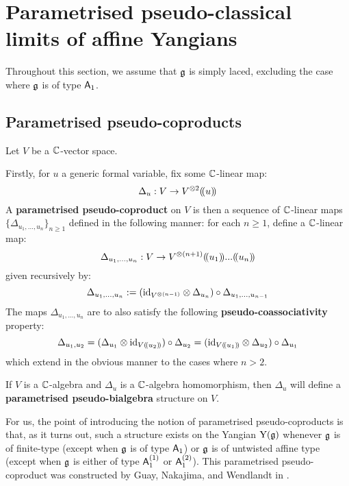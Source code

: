 \section{Parametrised pseudo-classical limits of affine Yangians}
    \begin{convention}
        Throughout this section, we assume that $\mathfrak{g}$ is simply laced, excluding the case where $\mathfrak{g}$ is of type $\mathsf{A}_1$. 
    \end{convention}

    \subsection{Parametrised pseudo-coproducts}
        \begin{definition} \label{def: parametrised_pseudo_coproducts}
            Let $V$ be a $\mathbb{C}$-vector space. 

            Firstly, for $u$ a generic formal variable, fix some $\mathbb{C}$-linear map:
                $$\Delta_u: V \to V^{\tensor 2}(\!(u)\!)$$
            A \textbf{parametrised pseudo-coproduct} on $V$ is then a sequence of $\mathbb{C}$-linear maps $\{\Delta_{u_1, ..., u_n}\}_{n \geq 1}$ defined in the following manner: for each $n \geq 1$, define a $\mathbb{C}$-linear map:
                $$\Delta_{u_1, ..., u_n}: V \to V^{\tensor (n + 1)}(\!(u_1)\!) ... (\!(u_n)\!)$$
            given recursively by:
                $$\Delta_{u_1, ..., u_n} := ( \id_{ V^{\tensor (n - 1)} } \tensor \Delta_{u_n} ) \circ \Delta_{u_1, ..., u_{n - 1}}$$
            The maps $\Delta_{u_1, ..., u_n}$ are to also satisfy the following \textbf{pseudo-coassociativity} property:
                $$\Delta_{u_1, u_2} = ( \Delta_{u_1} \tensor \id_{V(\!(u_2)\!)} ) \circ \Delta_{u_2} = ( \id_{V(\!(u_1)\!)} \tensor \Delta_{u_2} ) \circ \Delta_{u_1}$$
            which extend in the obvious manner to the cases where $n > 2$. 

            If $V$ is a $\mathbb{C}$-algebra and $\Delta_u$ is a $\mathbb{C}$-algebra homomorphism, then $\Delta_u$ will define a \textbf{parametrised pseudo-bialgebra} structure on $V$.
        \end{definition}
        For us, the point of introducing the notion of parametrised pseudo-coproducts is that, as it turns out, such a structure exists on the Yangian $\mathrm{Y}(\mathfrak{g})$ whenever $\mathfrak{g}$ is of finite-type (except when $\mathfrak{g}$ is of type $\mathsf{A}_1$) or $\mathfrak{g}$ is of untwisted affine type (except when $\mathfrak{g}$ is either of type $\mathsf{A}_1^{(1)}$ or $\mathsf{A}_1^{(2)}$). This parametrised pseudo-coproduct was constructed by Guay, Nakajima, and Wendlandt in \cite[Section 6]{guay_nakajima_wendlandt_affine_yangian_coproduct}.
